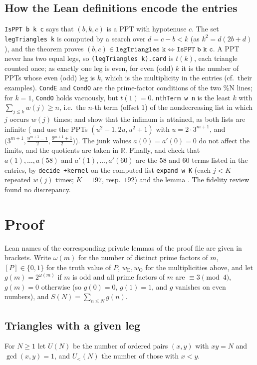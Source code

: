 \documentclass[11pt]{amsart}
\theoremstyle{plain}
\theoremstyle{definition}
\newcommand{\code}[1]{\texttt{#1}}
\newcommand{\R}{\mathbb{R}}
\newcommand{\wE}{w_{\mathrm E}}
\newcommand{\wO}{w_{\mathrm O}}
\begin{document}
\subsection*{How the Lean definitions encode the entries}
\code{IsPPT b k c} says that $(b,k,c)$ is a PPT with hypotenuse $c$. The set \code{legTriangles k} is computed by a search over $d=c-b<k$ (as $k^2=d(2b+d)$), and the theorem  proves $(b,c)\in\code{legTriangles k}\iff\code{IsPPT b k c}$. A PPT never has two equal legs, so \code{(legTriangles k).card} is $t(k)$, each triangle counted once; as exactly one leg is even, for even (odd) $k$ it is the number of PPTs whose even (odd) leg is $k$, which is the multiplicity in the entries (cf.\ their examples). \code{CondE} and \code{CondO} are the prime-factor conditions of the two \%N lines; for $k=1$, \code{CondO} holds vacuously, but $t(1)=0$. \code{nthTerm w n} is the least $k$ with $\sum_{j\le k}w(j)\ge n$, i.e.\ the $n$-th term (offset $1$) of the nondecreasing list in which $j$ occurs $w(j)$ times;  and  show that the infimum is attained, as both lists are infinite ( and  use the PPTs $(u^2-1,2u,u^2+1)$ with $u=2\cdot3^{m+1}$, and $\bigl(3^{m+1},\frac{9^{m+1}-1}2,\frac{9^{m+1}+1}2\bigr)$). The junk values $a(0)=a'(0)=0$ do not affect the limits, and the quotients are taken in $\R$. Finally,  and  check that $a(1),\dots,a(58)$ and $a'(1),\dots,a'(60)$ are the $58$ and $60$ terms listed in the entries, by \texttt{decide +kernel} on the computed list \code{expand w K} (each $j<K$ repeated $w(j)$ times; $K=197$, resp.\ $192$) and the lemma . The fidelity review found no discrepancy.

\section{Proof}\label{sec:proof}

Lean names of the corresponding private lemmas of the proof file are given in brackets. Write $\omega(m)$ for the number of distinct prime factors of $m$, $[P]\in\{0,1\}$ for the truth value of $P$, $\wE,\wO$ for the multiplicities above, and let $g(m)=2^{\omega(m)}$ if $m$ is odd and all prime factors of $m$ are $\equiv3\pmod4$, $g(m)=0$ otherwise (so $g(0)=0$, $g(1)=1$, and $g$ vanishes on even numbers), and $S(N)=\sum_{n\le N}g(n)$.

\subsection{Triangles with a given leg}
For $N\ge1$ let $U(N)$ be the number of ordered pairs $(x,y)$ with $xy=N$ and $\gcd(x,y)=1$, and $U_<(N)$ the number of those with $x<y$.
\end{document}
